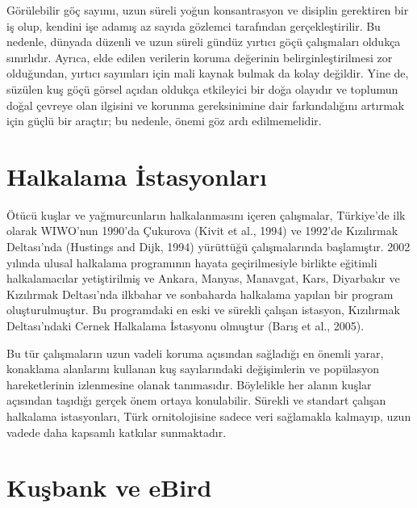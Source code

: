 \documentclass[
  a4paper,
  DIV=11,
  numbers=noendperiod]{scrartcl}
\begin{document}
Görülebilir göç sayımı, uzun süreli yoğun konsantrasyon ve disiplin
gerektiren bir iş olup, kendini işe adamış az sayıda gözlemci tarafından
gerçekleştirilir. Bu nedenle, dünyada düzenli ve uzun süreli gündüz
yırtıcı göçü çalışmaları oldukça sınırlıdır. Ayrıca, elde edilen
verilerin koruma değerinin belirginleştirilmesi zor olduğundan, yırtıcı
sayımları için mali kaynak bulmak da kolay değildir. Yine de, süzülen
kuş göçü görsel açıdan oldukça etkileyici bir doğa olayıdır ve toplumun
doğal çevreye olan ilgisini ve korunma gereksinimine dair farkındalığını
artırmak için güçlü bir araçtır; bu nedenle, önemi göz ardı
edilmemelidir.

\section*{Halkalama İstasyonları}\label{halkalama-istasyonlarux131}


Ötücü kuşlar ve yağmurcunların halkalanmasını içeren çalışmalar,
Türkiye'de ilk olarak WIWO'nun 1990'da Çukurova (Kivit et al., 1994) ve
1992'de Kızılırmak Deltası'nda (Hustings and Dijk, 1994) yürüttüğü
çalışmalarında başlamıştır. 2002 yılında ulusal halkalama programının
hayata geçirilmesiyle birlikte eğitimli halkalamacılar yetiştirilmiş ve
Ankara, Manyas, Manavgat, Kars, Diyarbakır ve Kızılırmak Deltası'nda
ilkbahar ve sonbaharda halkalama yapılan bir program oluşturulmuştur. Bu
programdaki en eski ve sürekli çalışan istasyon, Kızılırmak
Deltası'ndaki Cernek Halkalama İstasyonu olmuştur (Barış et al., 2005).

Bu tür çalışmaların uzun vadeli koruma açısından sağladığı en önemli
yarar, konaklama alanlarını kullanan kuş sayılarındaki değişimlerin ve
popülasyon hareketlerinin izlenmesine olanak tanımasıdır. Böylelikle her
alanın kuşlar açısından taşıdığı gerçek önem ortaya konulabilir. Sürekli
ve standart çalışan halkalama istasyonları, Türk ornitolojisine sadece
veri sağlamakla kalmayıp, uzun vadede daha kapsamlı katkılar
sunmaktadır.

\section*{Kuşbank ve eBird}\label{kuux15fbank-ve-ebird}

\end{document}
